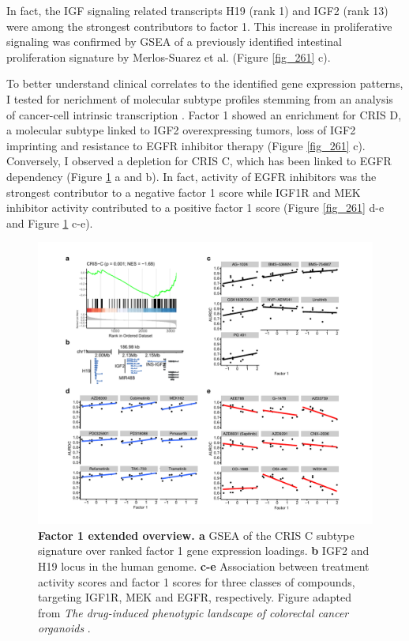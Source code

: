 \begin{flushleft}
In fact, the IGF signaling related transcripts H19 (rank 1) and IGF2 (rank 13) were among the strongest contributors to factor 1. This increase in proliferative signaling was confirmed by GSEA of a previously identified intestinal proliferation signature by Merlos-Suarez et al. \citep{Merlos-Suarez2011-gd} (Figure \ref{fig_261} c). 

\bigbreak
To better understand clinical correlates to the identified gene expression patterns, I tested for nerichment of molecular subtype profiles stemming from an analysis of cancer-cell intrinsic transcription \citep{Isella2017-bm}. Factor 1 showed an enrichment for CRIS D, a molecular subtype linked to IGF2 overexpressing tumors, loss of IGF2 imprinting and resistance to EGFR inhibitor therapy (Figure \ref{fig_261} c). Conversely, I observed a depletion for CRIS C, which has been linked to EGFR dependency (Figure \ref{fig_262} a and b). In fact, activity of EGFR inhibitors was the strongest contributor to a negative factor 1 score while IGF1R and MEK inhibitor activity contributed to a positive factor 1 score (Figure \ref{fig_261} d-e and Figure \ref{fig_262} c-e).

\begin{figure}[h!]
\centering
\includegraphics[width=\textwidth,
                height=\textheight,
                keepaspectratio]{figures/promise/pdf/fig_6_2.pdf}
\caption[Factor 1 extended overview]{\textbf{Factor 1 extended overview. a} GSEA of the CRIS C subtype signature over ranked factor 1 gene expression loadings. \textbf{b} IGF2 and H19 locus in the human genome. \textbf{c-e} Association between treatment activity scores and factor 1 scores for three classes of compounds, targeting IGF1R, MEK and EGFR, respectively. Figure adapted from \textit{The drug-induced phenotypic landscape of colorectal cancer organoids} \citep{Betge2022-kr}.}
\label{fig_262}
\end{figure}


\end{flushleft}
